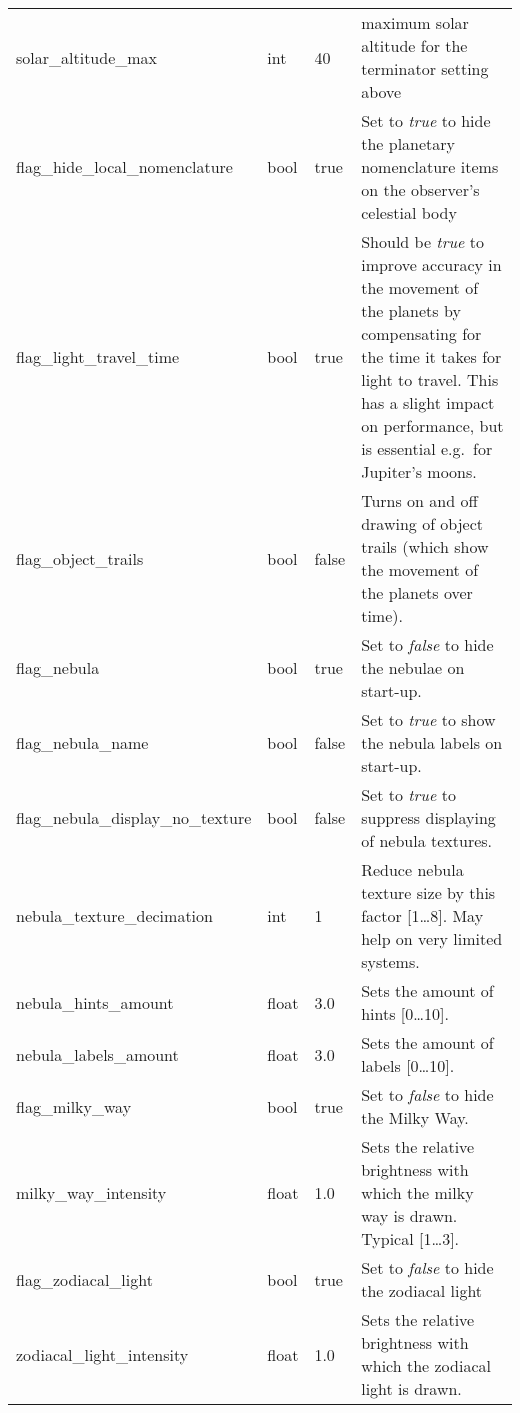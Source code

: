 \begin{longtable}{l|l|l|p{55mm}}
\hspace{12mm}solar\_altitude\_max   & int    & 40 & maximum solar altitude for the terminator setting above\\
flag\_hide\_local\_nomenclature    & bool   & true  & Set to \emph{true} to hide the planetary nomenclature items on the observer's celestial body\\\midrule
%
flag\_light\_travel\_time          & bool   & true  & Should be \emph{true} to improve accuracy in the movement of the planets by compensating 
                                           for the time it takes for light to travel. This has a slight impact on performance, 
                                           but is essential e.g.\ for Jupiter's moons.\\%
flag\_object\_trails               & bool   & false & Turns on and off drawing of object trails (which show the movement of the planets over time).\\%
%
flag\_nebula                       & bool   & true  & Set to \emph{false} to hide the nebulae on start-up. \\%
flag\_nebula\_name                 & bool   & false & Set to \emph{true} to show the nebula labels on start-up. \\%
flag\_nebula\_display\_no\_texture & bool   & false & Set to \emph{true} to suppress displaying of nebula textures. \\%
nebula\_texture\_decimation        & int    & 1     & Reduce nebula texture size by this factor [1\ldots8]. May help on very limited systems. \\
nebula\_hints\_amount              & float  & 3.0   & Sets the amount of hints [0\ldots10]. \\%
nebula\_labels\_amount             & float  & 3.0   & Sets the amount of labels [0\ldots10].\\%
flag\_milky\_way                   & bool   & true  & Set to \emph{false} to hide the Milky Way.\\%
milky\_way\_intensity              & float  & 1.0   & Sets the relative brightness with which the milky way is drawn. Typical [1\ldots3]. \\%
flag\_zodiacal\_light              & bool   & true  & Set to \emph{false} to hide the zodiacal light\\%
zodiacal\_light\_intensity         & float  & 1.0   & Sets the relative brightness with which the zodiacal light is drawn. \\%

\end{longtable}
